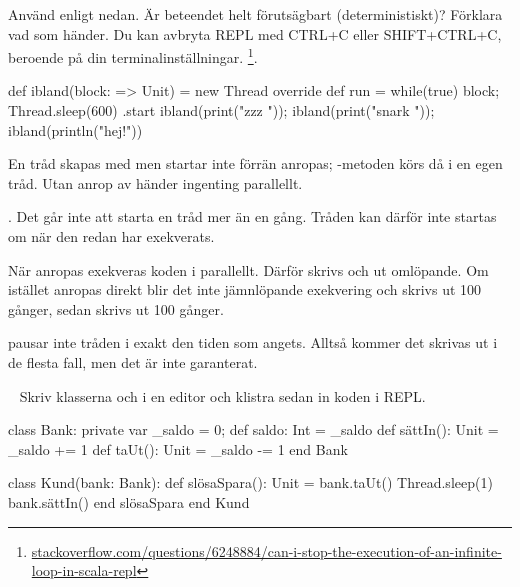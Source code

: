 \Subtask Använd  enligt nedan. Är beteendet helt förutsägbart (deterministiskt)? Förklara vad som händer. Du kan avbryta REPL med CTRL+C eller SHIFT+CTRL+C, beroende på din terminalinställningar.%
\footnote{\href{http://stackoverflow.com/questions/6248884/can-i-stop-the-execution-of-an-infinite-loop-in-scala-repl}{stackoverflow.com/questions/6248884/can-i-stop-the-execution-of-an-infinite-loop-in-scala-repl}}.
\begin{REPL}
def ibland(block: => Unit) = new Thread {
  override def run = while(true) { block; Thread.sleep(600) }
}.start
ibland(print("zzz ")); ibland(print("snark ")); ibland(println("hej!"))
\end{REPL}


\SOLUTION


\TaskSolved \what

\SubtaskSolved
En tråd skapas med  men startar inte förrän  anropas; -metoden körs då i en egen tråd. Utan anrop av  händer ingenting parallellt.

\SubtaskSolved  {}. Det går inte att starta en tråd mer än en gång. Tråden kan därför inte startas om när den redan har exekverats.

\SubtaskSolved   När  anropas exekveras koden i  parallellt. Därför skrivs  och  ut omlöpande. Om istället  anropas direkt blir det inte jämnlöpande exekvering och  skrivs ut 100 gånger, sedan skrivs  ut 100 gånger.

\SubtaskSolved   {} pausar inte tråden i exakt den tiden som angets. Alltså kommer det skrivas ut  i de flesta fall, men det är inte garanterat.



\QUESTEND







\QUESTBEGIN

\Task \label{task:racecondition} \what~   Skriv klasserna  och  i en editor och klistra sedan in koden i REPL.

\begin{Code}
class Bank:
  private var _saldo = 0;
  def saldo: Int = _saldo
  def sättIn(): Unit = _saldo += 1 
  def taUt(): Unit   = _saldo -= 1 
end Bank

class Kund(bank: Bank):
  def slösaSpara(): Unit = 
    bank.taUt()
    Thread.sleep(1)
    bank.sättIn()
  end slösaSpara
end Kund
\end{Code}

